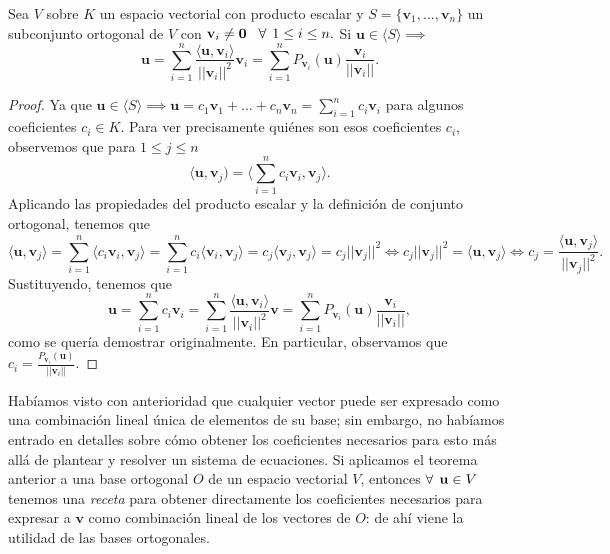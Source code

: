 \documentclass[12pt,dvipsnames]{article}
\newenvironment{teorema}[2][Teorema]{\begin{trivlist}
\item[\hskip \labelsep {\bfseries #1}\hskip \labelsep {\bfseries #2.}]}{\end{trivlist}}
\begin{document}
\begin{teorema} {4.3.1.1} \label{Teo:4.3.1.1}
    Sea $V$ sobre $K$ un espacio vectorial con producto escalar y $S=\{\mathbf{v}_1, ..., \mathbf{v}_n\}$ un subconjunto ortogonal de $V$ con $\mathbf{v}_i\neq\mathbf{0}\hspace{3mm}\forall\hspace{1.5mm} 1\leq i\leq n.$ Si $\mathbf{u}\in \langle S \rangle \implies$ $$\mathbf{u} = \sum_{i=1}^n \frac{\langle\mathbf{u},\mathbf{v}_i\rangle}{||\mathbf{v}_i||^2}\mathbf{v}_i=\sum_{i=1}^n P_{\mathbf{v}_i}(\mathbf{u})\frac{\mathbf{v}_i}{||\mathbf{v}_i||}.$$

\begin{proof}
    Ya que $\mathbf{u}\in\langle S \rangle \implies \mathbf{u}=c_1\mathbf{v}_1+...+c_n\mathbf{v}_n=\sum_{i=1}^n c_i\mathbf{v}_i$ para algunos coeficientes $c_i\in K$. Para ver precisamente quiénes son esos coeficientes $c_i$, observemos que para $1\leq j\leq n$ $$\langle\mathbf{u},\mathbf{v}_j)=\big \langle \sum_{i=1}^n c_i\mathbf{v}_i, \mathbf{v}_j \big \rangle.$$ \noindent Aplicando las propiedades del producto escalar y la definición de conjunto ortogonal, tenemos que $$\langle\mathbf{u},\mathbf{v}_j\rangle=\sum_{i=1}^n \langle c_i\mathbf{v}_i, \mathbf{v}_j\rangle= \sum_{i=1}^n c_i\langle\mathbf{v}_i,\mathbf{v}_j\rangle=c_j\langle\mathbf{v}_j,\mathbf{v}_j\rangle=c_j||\mathbf{v}_j||^2\iff c_j||\mathbf{v}_j||^2=\langle\mathbf{u},\mathbf{v}_j\rangle\iff c_j=\frac{\langle\mathbf{u},\mathbf{v}_j\rangle}{||\mathbf{v}_j||^2}.$$ Sustituyendo, tenemos que \[
        \mathbf{u}=\sum_{i=1}^n c_i \mathbf{v}_i=\sum_{i=1}^n \frac{\langle\mathbf{u},\mathbf{v}_i\rangle}{||\mathbf{v}_i||^2}\mathbf{v}=\sum_{i=1}^n P_{\mathbf{v}_i}(\mathbf{u})\frac{\mathbf{v}_i}{||\mathbf{v}_i||}
    ,\] \noindent como se quería demostrar originalmente. En particular, observamos que $c_i= \frac{P_{\mathbf{v}_i}(\mathbf{u})}{||\mathbf{v}_i||}.$
\end{proof}

Habíamos visto con anterioridad que cualquier vector puede ser expresado como una combinación lineal única de elementos de su base; sin embargo, no habíamos entrado en detalles sobre cómo obtener los coeficientes necesarios para esto más allá de plantear y resolver un sistema de ecuaciones. Si aplicamos el teorema anterior a una base ortogonal $O$ de un espacio vectorial $V$, entonces $\forall\hspace{1.5mm} \mathbf{u}\in V $ tenemos una \emph{receta} para obtener directamente los coeficientes necesarios para expresar a $\mathbf{v}$ como combinación lineal de los vectores de $O$: de ahí viene la utilidad de las bases ortogonales.


\end{teorema}
\end{document}
